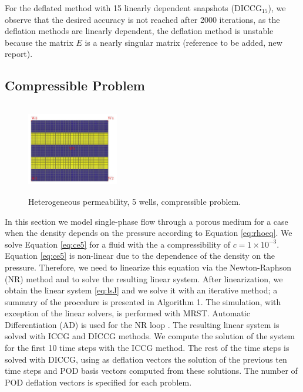 \documentclass[review]{elsarticle}
\begin{document}
For the deflated method with 15 linearly dependent snapshots (DICCG$_{15}$), we observe that the desired accuracy is not reached after 2000 iterations, as the deflation methods are linearly dependent, the deflation method is unstable because the matrix $E$ is a nearly singular matrix (reference to be added, new report).
\subsection{Compressible Problem}

\begin{figure}
\centering 
\vspace{-20pt}
\includegraphics[width=4cm,height=4cm,keepaspectratio]{images/perm70.jpg}
 \vspace{-15pt}
\caption{ Heterogeneous permeability, 5 wells, compressible problem.}\label{fig:pc}
\vspace{-10pt}
\end{figure} 
In this section we model single-phase flow through a porous medium for a case when the density depends on the pressure 
according to Equation \eqref{eq:rhoeq}. We solve Equation \eqref{eq:ce5} for a fluid with the a compressibility of $c= 1 \times 10^{-3}$.
Equation \eqref{eq:ce5} is non-linear due to the dependence of the density on the pressure. Therefore, we need to 
linearize this equation via the Newton-Raphson (NR) method and to solve the resulting linear system. After linearization, we obtain the linear system \eqref{eq:lsJ} and we solve it with an iterative method; a summary of the procedure is presented in Algorithm 1. The simulation, with exception of the linear solvers, is performed with MRST. Automatic Differentiation (AD) is used for the NR loop \cite{Lie13}. The resulting linear system is solved with ICCG and DICCG methods. We compute the solution of the system for the first 10 time steps with the ICCG method. The rest of the time steps is solved with DICCG, using as deflation vectors the solution of the previous ten time steps and POD basis vectors computed from these solutions. The number of POD deflation vectors is specified for each problem. \\
\end{document}
